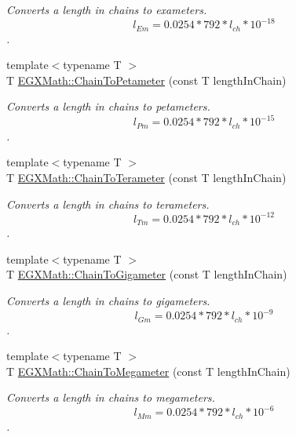 \begin{DoxyCompactItemize}
\begin{DoxyCompactList}\small\item\em Converts a length in chains to exameters. \[ l_{Em}=0.0254 * 792 * l_{ch} * 10^{-18} \]. \end{DoxyCompactList}\item 
{\footnotesize template$<$typename T $>$ }\\T \mbox{\hyperlink{group___e_g_x_math-_conversions-_length_conversions-_surveyors-_chain-_s_i_ga4a40c43d2437af26f04a678f438451ce}{E\+G\+X\+Math\+::\+Chain\+To\+Petameter}} (const T length\+In\+Chain)
\begin{DoxyCompactList}\small\item\em Converts a length in chains to petameters. \[ l_{Pm}=0.0254 * 792 * l_{ch} * 10^{-15} \]. \end{DoxyCompactList}\item 
{\footnotesize template$<$typename T $>$ }\\T \mbox{\hyperlink{group___e_g_x_math-_conversions-_length_conversions-_surveyors-_chain-_s_i_ga8940f5211af58a3bf708412ad2d7ba96}{E\+G\+X\+Math\+::\+Chain\+To\+Terameter}} (const T length\+In\+Chain)
\begin{DoxyCompactList}\small\item\em Converts a length in chains to terameters. \[ l_{Tm}=0.0254 * 792 * l_{ch} * 10^{-12} \]. \end{DoxyCompactList}\item 
{\footnotesize template$<$typename T $>$ }\\T \mbox{\hyperlink{group___e_g_x_math-_conversions-_length_conversions-_surveyors-_chain-_s_i_ga4e3a17428c28a61c1aaf1de8c094f31d}{E\+G\+X\+Math\+::\+Chain\+To\+Gigameter}} (const T length\+In\+Chain)
\begin{DoxyCompactList}\small\item\em Converts a length in chains to gigameters. \[ l_{Gm}=0.0254 * 792 * l_{ch} * 10^{-9} \]. \end{DoxyCompactList}\item 
{\footnotesize template$<$typename T $>$ }\\T \mbox{\hyperlink{group___e_g_x_math-_conversions-_length_conversions-_surveyors-_chain-_s_i_gad564a80fe3ce7cb8c129758004256a12}{E\+G\+X\+Math\+::\+Chain\+To\+Megameter}} (const T length\+In\+Chain)
\begin{DoxyCompactList}\small\item\em Converts a length in chains to megameters. \[ l_{Mm}=0.0254 * 792 * l_{ch} * 10^{-6} \]. \end{DoxyCompactList}\item 

\end{DoxyCompactItemize}

